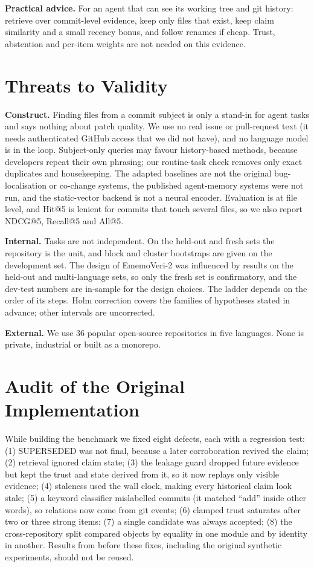 \documentclass[conference]{IEEEtran}
\newcommand{\sys}{EmemoVeri}
\begin{document}
\textbf{Practical advice.} For an agent that can see its working tree and git history: retrieve over commit-level evidence, keep only files that exist, keep claim similarity and a small recency bonus, and follow renames if cheap. Trust, abstention and per-item weights are not needed on this evidence.

\section{Threats to Validity}
\label{sec:threats}
\textbf{Construct.} Finding files from a commit subject is only a stand-in for agent tasks and says nothing about patch quality. We use no real issue or pull-request text (it needs authenticated GitHub access that we did not have), and no language model is in the loop. Subject-only queries may favour history-based methods, because developers repeat their own phrasing; our routine-task check removes only exact duplicates and housekeeping. The adapted baselines are not the original bug-localisation or co-change systems, the published agent-memory systems were not run, and the static-vector backend is not a neural encoder. Evaluation is at file level, and Hit@5 is lenient for commits that touch several files, so we also report NDCG@5, Recall@5 and All@5.

\textbf{Internal.} Tasks are not independent. On the held-out and fresh sets the repository is the unit, and block and cluster bootstraps are given on the development set. The design of \sys{}-2 was influenced by results on the held-out and multi-language sets, so only the fresh set is confirmatory, and the dev-test numbers are in-sample for the design choices. The ladder depends on the order of its steps. Holm correction covers the families of hypotheses stated in advance; other intervals are uncorrected.

\textbf{External.} We use 36 popular open-source repositories in five languages. None is private, industrial or built as a monorepo.

\section{Audit of the Original Implementation}
\label{sec:audit}
While building the benchmark we fixed eight defects, each with a regression test: (1) SUPERSEDED was not final, because a later corroboration revived the claim; (2) retrieval ignored claim state; (3) the leakage guard dropped future evidence but kept the trust and state derived from it, so it now replays only visible evidence; (4) staleness used the wall clock, making every historical claim look stale; (5) a keyword classifier mislabelled commits (it matched ``add'' inside other words), so relations now come from git events; (6) clamped trust saturates after two or three strong items; (7) a single candidate was always accepted; (8) the cross-repository split compared objects by equality in one module and by identity in another. Results from before these fixes, including the original synthetic experiments, should not be reused.
\end{document}
